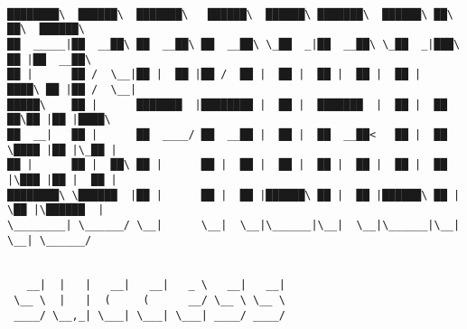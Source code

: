 \documentclass[varwidth=\maxdimen,margin=0.5cm,multi={verbatim}]{standalone}
\begin{document}
\begin{verbatim}

████████\  ██████\  ███████\   ██████\  ██████\ ███████\  ██████\ ██\   ██\  ██████\
██  _____|██  __██\ ██  __██\ ██  __██\ \_██  _|██  __██\ \_██  _|███\  ██ |██  __██\
██ |      ██ /  \__|██ |  ██ |██ /  ██ |  ██ |  ██ |  ██ |  ██ |  ████\ ██ |██ /  \__|
█████\    ██ |      ███████  |████████ |  ██ |  ███████  |  ██ |  ██ ██\██ |██ |████\
██  __|   ██ |      ██  ____/ ██  __██ |  ██ |  ██  __██<   ██ |  ██ \████ |██ |\_██ |
██ |      ██ |  ██\ ██ |      ██ |  ██ |  ██ |  ██ |  ██ |  ██ |  ██ |\███ |██ |  ██ |
████████\ \██████  |██ |      ██ |  ██ |██████\ ██ |  ██ |██████\ ██ | \██ |\██████  |
\________| \______/ \__|      \__|  \__|\______|\__|  \__|\______|\__|  \__| \______/

                                            
   __|  |   |   __|   __|   _ \   __|   __|
 \__ \  |   |  (     (      __/ \__ \ \__ \
 ____/ \__,_| \___| \___| \___| ____/ ____/



\end{verbatim}
\end{document}
